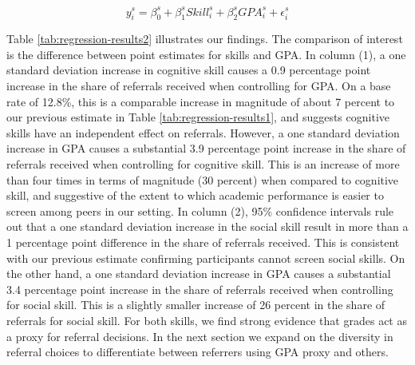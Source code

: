 \documentclass[11pt,a4paper,oneside]{article}
\begin{document}
\begin{equation}\label{skill_gpa}
  y_{i}^{s} = \beta_{0}^{s} + \beta_{1}^{s}{Skill}_{i}^{s} + \beta_{2}^{s}{GPA}_{i}^{s} + \epsilon_{i}^{s}    
\end{equation} 

Table \ref{tab:regression-results2} illustrates our findings. The comparison of interest is the difference between point estimates for skills and GPA. In column (1), a one standard deviation increase in cognitive skill causes a 0.9 percentage point increase in the share of referrals received when controlling for GPA. On a base rate of 12.8\%, this is a comparable increase in magnitude of about 7 percent to our previous estimate in Table \ref{tab:regression-results1}, and suggests cognitive skills have an independent effect on referrals. However, a one standard deviation increase in GPA causes a substantial 3.9 percentage point increase in the share of referrals received when controlling for cognitive skill. This is an increase of more than four times in terms of magnitude (30 percent) when compared to cognitive skill, and suggestive of the extent to which academic performance is easier to screen among peers in our setting. In column (2), 95\% confidence intervals rule out that a one standard deviation increase in the social skill result in more than a 1 percentage point difference in the share of referrals received. This is consistent with our previous estimate confirming participants cannot screen social skills. On the other hand, a one standard deviation increase in GPA causes a substantial 3.4 percentage point increase in the share of referrals received when controlling for social skill. This is a slightly smaller increase of 26 percent in the share of referrals for social skill. For both skills, we find strong evidence that grades act as a proxy for referral decisions. In the next section we expand on the diversity in referral choices to differentiate between referrers using GPA proxy and others.
\end{document}
